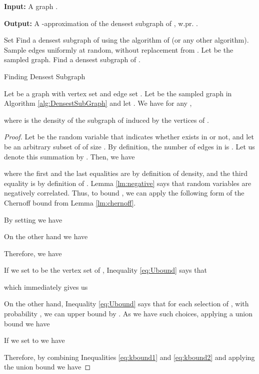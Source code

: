 \begin{algorithm*}\textbf{Input:} A graph .

\textbf{Output:} A -approximation of the densest subgraph of , w.pr. .

\begin{algorithmic}[1]
    \STATE Set 
    \IF{}
    	\STATE Find a densest subgraph of  using the algorithm of \cite{charikar2000greedy} (or any other algorithm).
    \ELSE
    	\STATE Sample  edges uniformly at random, without replacement from .
    	\STATE Let  be the sampled graph.
    	\STATE Find a densest subgraph of .
    \ENDIF
\end{algorithmic}

\caption{Finding Densest Subgraph}
\label{alg:DensestSubGraph}
\end{algorithm*}

\begin{lemma}\label{lm:kBoundDS}
Let  be a graph with vertex set  and edge set . Let  be the sampled graph in Algorithm \ref{alg:DensestSubGraph} and let .
We have for any , 

where  is the density of the subgraph of  induced by the vertices of .
\end{lemma}

\begin{proof}
	Let  be the random variable that indicates whether  exists in  or not, and
	let  be an arbitrary subset of  of size . By definition, the number of edges in  is . Let us denote this summation by . Then, we have
	
	where the first and the last equalities are by definition of density, and the third equality is by definition of .
	Lemma \ref{lm:negative} says that random variables  are negatively correlated. Thus, to bound , we can apply the following form of the Chernoff bound from Lemma \ref{lm:chernoff}.
	
	By setting  we have

On the other hand we have
	
Therefore, we have
	
If we set  to be the vertex set of , Inequality \ref{eq:Ubound} says that 
	
	which immediately gives us
	
	
	On the other hand, Inequality \ref{eq:Ubound} says that for each selection of , with probability , we can upper bound   by 
	. 
	As we have  such choices, applying a union bound we have

	If we set  to  we have
	
Therefore, by combining Inequalities \ref{eq:kbound1} and \ref{eq:kbound2} and applying the union bound we have
	
\end{proof}




